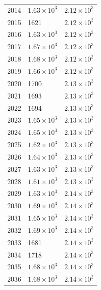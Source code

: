 \begin{table}[H]
\begin{tabular}{lll}
2014 & $\displaystyle 1.63 \times 10^{3}$ & $\displaystyle 2.12 \times 10^{3}$ \\
2015 & 1621 & $\displaystyle 2.12 \times 10^{3}$ \\
2016 & $\displaystyle 1.63 \times 10^{3}$ & $\displaystyle 2.12 \times 10^{3}$ \\
2017 & $\displaystyle 1.67 \times 10^{3}$ & $\displaystyle 2.12 \times 10^{3}$ \\
2018 & $\displaystyle 1.68 \times 10^{3}$ & $\displaystyle 2.12 \times 10^{3}$ \\
2019 & $\displaystyle 1.66 \times 10^{3}$ & $\displaystyle 2.12 \times 10^{3}$ \\
2020 & 1700 & $\displaystyle 2.13 \times 10^{3}$ \\
2021 & 1693 & $\displaystyle 2.13 \times 10^{3}$ \\
2022 & 1694 & $\displaystyle 2.13 \times 10^{3}$ \\
2023 & $\displaystyle 1.65 \times 10^{3}$ & $\displaystyle 2.13 \times 10^{3}$ \\
2024 & $\displaystyle 1.65 \times 10^{3}$ & $\displaystyle 2.13 \times 10^{3}$ \\
2025 & $\displaystyle 1.62 \times 10^{3}$ & $\displaystyle 2.13 \times 10^{3}$ \\
2026 & $\displaystyle 1.64 \times 10^{3}$ & $\displaystyle 2.13 \times 10^{3}$ \\
2027 & $\displaystyle 1.63 \times 10^{3}$ & $\displaystyle 2.13 \times 10^{3}$ \\
2028 & $\displaystyle 1.61 \times 10^{3}$ & $\displaystyle 2.13 \times 10^{3}$ \\
2029 & $\displaystyle 1.63 \times 10^{3}$ & $\displaystyle 2.14 \times 10^{3}$ \\
2030 & $\displaystyle 1.69 \times 10^{3}$ & $\displaystyle 2.14 \times 10^{3}$ \\
2031 & $\displaystyle 1.65 \times 10^{3}$ & $\displaystyle 2.14 \times 10^{3}$ \\
2032 & $\displaystyle 1.69 \times 10^{3}$ & $\displaystyle 2.14 \times 10^{3}$ \\
2033 & 1681 & $\displaystyle 2.14 \times 10^{3}$ \\
2034 & 1718 & $\displaystyle 2.14 \times 10^{3}$ \\
2035 & $\displaystyle 1.68 \times 10^{3}$ & $\displaystyle 2.14 \times 10^{3}$ \\
2036 & $\displaystyle 1.68 \times 10^{3}$ & $\displaystyle 2.14 \times 10^{3}$ \\

\end{tabular}
\end{table}
